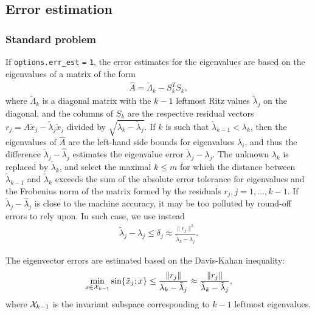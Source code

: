 \subsection{Error estimation}

\label{sec:err.est}

\subsubsection{Standard problem}

If {\tt options.err\_est} {\tt =} {\tt 1}, 
the error estimates for the eigenvalues are based on 
the eigenvalues of a matrix of the form
%
\begin{eqnarray}
\label{L.mx}
\hat A = %
\tilde\Lambda_k - S_k^T S_k,
\end{eqnarray}
%
where $\tilde\Lambda_k$ is a diagonal matrix with
the $k-1$ leftmost Ritz values $\tilde\lambda_j$
on the diagonal,
and the columns of $S_k$ are the respective
residual vectors $r_j = A \tilde x_j - \tilde\lambda_j \tilde x_j$
divided by $\sqrt{\lambda_k - \tilde\lambda_j}$.
If $k$ is such that
$\tilde\lambda_{k-1} < \lambda_k$,
then the eigenvalues of $\hat A$ are
the left-hand side bounds for
eigenvalues $\lambda_i$,
and thus
the difference $\tilde\lambda_j - \hat\lambda_j$ estimates
the eigenvalue error $\tilde\lambda_j - \lambda_j$.
The unknown  $\lambda_k$ is replaced by $\tilde\lambda_k$,
and select the maximal $k \le m$ for which
the distance between $\tilde\lambda_{k-1}$ and $\tilde\lambda_k$
exceeds the sum of the absolute error tolerance for eigenvalues
and the Frobenius norm of the matrix formed by the residuals
$r_j, j = 1, \ldots, k-1$.
If  $\tilde\lambda_j - \hat\lambda_j$
is close to the machine accuracy, it may be too polluted
by round-off errors to rely upon.
In such case, we use instead
%
\begin{eqnarray}
\label{aL}
\tilde\lambda_j - \lambda_j \le \delta_j \approx
\frac{\|r_j\|^2}{\tilde\lambda_k - \lambda_j}.
\end{eqnarray}

The eigenvector errors are estimated based on 
the Davis-Kahan inequality:
%
\begin{eqnarray}
\label{DK}
\min_{x \in {\cal X}_{k-1}}
\sin\{\tilde x_j; x\} \le
\frac{\|r_j\|}{\lambda_k - \tilde\lambda_j} \approx
\frac{\|r_j\|}{\tilde\lambda_k - \tilde\lambda_j},
\end{eqnarray}
%
where ${\cal X}_{k-1}$ is the invariant subspace 
corresponding to $k-1$ leftmost eigenvalues.

